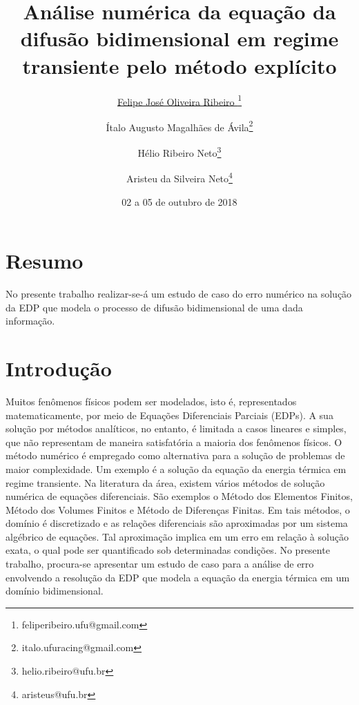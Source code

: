 \documentclass[10pt,twoside,a4paper]{article}
\date{02 a 05 de outubro de 2018}
\title{Análise numérica da equação da difusão bidimensional em regime transiente pelo método explícito}
\author[1]{\underline{Felipe José Oliveira Ribeiro }\thanks{feliperibeiro.ufu@gmail.com}}
\author[1]{Ítalo Augusto Magalhães de Ávila\thanks{italo.ufuracing@gmail.com}}
\author[1]{Hélio Ribeiro Neto\thanks{helio.ribeiro@ufu.br}}
\author[1]{Aristeu da Silveira Neto\thanks{aristeus@ufu.br}}
\affil[1]{FEMEC - Universidade Federal de Uberlândia}
\begin{document}
	\inserirtitulo
	\linespread{1.5}%
	
	\section{Resumo}
	No presente trabalho realizar-se-á um estudo de caso do erro numérico na solução da EDP que modela o processo de difusão bidimensional de uma dada informação. 
	
	
	\section{Introdução} %
	
	Muitos fenômenos físicos podem ser modelados, isto é, representados matematicamente, por meio de Equações Diferenciais Parciais (EDPs). A sua solução por métodos analíticos, no entanto, é limitada a casos lineares e simples, que não representam de maneira satisfatória a maioria dos fenômenos físicos. O método numérico é empregado como alternativa para a solução de problemas de maior complexidade. Um exemplo é a solução da equação da energia térmica em regime transiente. Na literatura da área, existem vários métodos de solução numérica de equações diferenciais. São exemplos o Método dos Elementos Finitos, Método dos Volumes Finitos e Método de Diferenças Finitas. Em tais métodos, o domínio é discretizado e as relações diferenciais são aproximadas por um sistema  algébrico de equações. Tal aproximação implica em um erro em relação à solução exata, o qual pode ser quantificado sob determinadas condições. No presente trabalho, procura-se apresentar um estudo de caso para a análise de erro envolvendo a resolução da EDP que modela a equação da energia térmica em um domínio bidimensional. 
	
	
\end{document}
